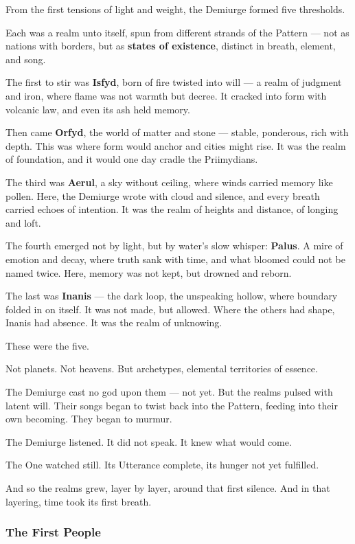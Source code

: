 \documentclass[12pt]{article}
\begin{document}
From the first tensions of light and weight, the Demiurge formed five thresholds.

Each was a realm unto itself, spun from different strands of the Pattern —  
not as nations with borders, but as \textbf{states of existence}, distinct in breath, element, and song.

The first to stir was \textbf{Isfyd}, born of fire twisted into will — a realm of judgment and iron, where flame was not warmth but decree.  
It cracked into form with volcanic law, and even its ash held memory.

Then came \textbf{Orfyd}, the world of matter and stone — stable, ponderous, rich with depth.  
This was where form would anchor and cities might rise.  
It was the realm of foundation, and it would one day cradle the Priimydians.

The third was \textbf{Aerul}, a sky without ceiling, where winds carried memory like pollen.  
Here, the Demiurge wrote with cloud and silence, and every breath carried echoes of intention.  
It was the realm of heights and distance, of longing and loft.

The fourth emerged not by light, but by water’s slow whisper: \textbf{Palus}.  
A mire of emotion and decay, where truth sank with time, and what bloomed could not be named twice.  
Here, memory was not kept, but drowned and reborn.

The last was \textbf{Inanis} — the dark loop, the unspeaking hollow, where boundary folded in on itself.  
It was not made, but allowed.  
Where the others had shape, Inanis had absence.  
It was the realm of unknowing.

These were the five.

Not planets. Not heavens.  
But archetypes, elemental territories of essence.

The Demiurge cast no god upon them — not yet.  
But the realms pulsed with latent will.  
Their songs began to twist back into the Pattern, feeding into their own becoming.  
They began to murmur.

The Demiurge listened. It did not speak.  
It knew what would come.

The One watched still.  
Its Utterance complete, its hunger not yet fulfilled.

And so the realms grew, layer by layer, around that first silence.  
And in that layering, time took its first breath.

\dotfill

\subsubsection*{The First People}
\end{document}
